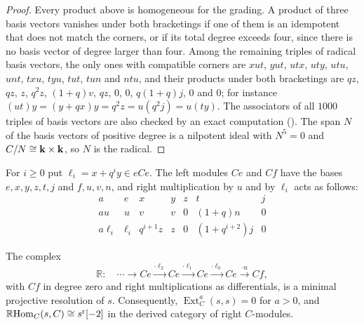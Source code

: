 \begin{proof}
  Every product above is homogeneous for the grading. A product of three
  basis vectors vanishes under both bracketings if one of them is an
  idempotent that does not match the corners, or if its total degree exceeds
  four, since there is no basis vector of degree larger than four. Among the
  remaining triples of radical basis vectors, the only ones with compatible
  corners are $xut$, $yut$, $utx$, $uty$, $utu$, $unt$, $txu$, $tyu$, $tut$,
  $tun$ and $ntu$, and their products under both bracketings are $qz$, $qz$,
  $z$, $q^2z$, ${(1+q)v}$, $qz$, $0$, $0$, ${q(1+q)j}$, $0$ and $0$; for instance
  ${(ut)y=(y+qx)y=q^2z=u(q^2j)=u(ty)}$. The associators of all $1000$ triples
  of basis vectors are also checked by an exact computation
  (). The span $N$ of the basis vectors of positive
  degree is a nilpotent ideal with ${N^5=0}$ and ${C/N\cong\mathbf{k}\times\mathbf{k}}$, so $N$
  is the radical.
\end{proof}

For ${i\geq0}$ put ${\ell_i=x+q^iy\in eCe}$. The left modules $Ce$ and $Cf$ have
the bases $e,x,y,z,t,j$ and $f,u,v,n$, and right multiplication by $u$ and by
$\ell_i$ acts as follows:
\begin{equation}
  \label{eq:C-right-multiplication}
  \begin{array}{c|cccccc}
    a&e&x&y&z&t&j\\\hline
    au&u&v&v&0&(1+q)n&0\\
    a\ell_i&\ell_i&q^{i+1}z&z&0&(1+q^{i+2})j&0
  \end{array}
\end{equation}

\begin{proposition}
  \label{prop:C-resolution}
  The complex
  \[
    \mathbb{R}\colon\quad\cdots\longrightarrow Ce\xrightarrow{\cdot\ell_2}Ce
    \xrightarrow{\cdot\ell_1}Ce\xrightarrow{\cdot\ell_0}Ce
    \xrightarrow{\cdot u}Cf,
  \]
  with $Cf$ in degree zero and right multiplications as differentials, is a
  minimal projective resolution of $s$. Consequently,
  ${\operatorname{Ext}^a_C(s,s)=0}$ for ${a>0}$, and ${\RHom[C]{s}{C}\cong
  s^{\mathrm{r}}[-2]}$ in the derived category of right $C$-modules.
\end{proposition}


